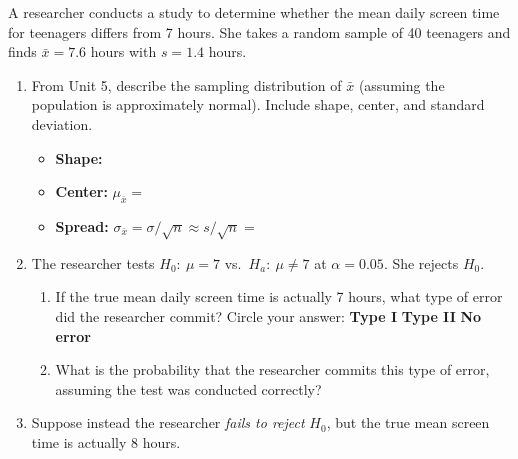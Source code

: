 \documentclass[10pt]{article}
\begin{document}
\namedateperiod

\vspace{0.15in}

A researcher conducts a study to determine whether the mean daily screen time for
teenagers differs from 7 hours. She takes a random sample of 40 teenagers and finds
$\bar x = 7.6$ hours with $s = 1.4$ hours.

\begin{enumerate}
  \item From Unit 5, describe the sampling distribution of $\bar x$ (assuming the
        population is approximately normal). Include shape, center, and standard deviation.

        \begin{itemize}
          \item \textbf{Shape:} \blank{7cm}
          \item \textbf{Center:} $\mu_{\bar x} = $ \blank{3cm}
          \item \textbf{Spread:} $\sigma_{\bar x} = \sigma/\sqrt{n} \approx s/\sqrt{n} = $ \blank{4cm}
        \end{itemize}

        \vspace{0.05in}

  \item The researcher tests $H_0{:}\ \mu = 7$ vs.\ $H_a{:}\ \mu \ne 7$ at $\alpha = 0.05$.
        She rejects $H_0$.

        \begin{enumerate}[label=\alph*.]
          \item If the true mean daily screen time is actually 7 hours, what type of
                error did the researcher commit? Circle your answer: \quad \textbf{Type I} \quad
                \textbf{Type II} \quad \textbf{No error}

                \vspace{0.05in}
          \item What is the probability that the researcher commits this type of error,
                assuming the test was conducted correctly? \blank{3cm}
        \end{enumerate}

        \vspace{0.05in}

  \item Suppose instead the researcher \emph{fails to reject} $H_0$, but the true
        mean screen time is actually 8 hours.


\end{enumerate}
\end{document}
